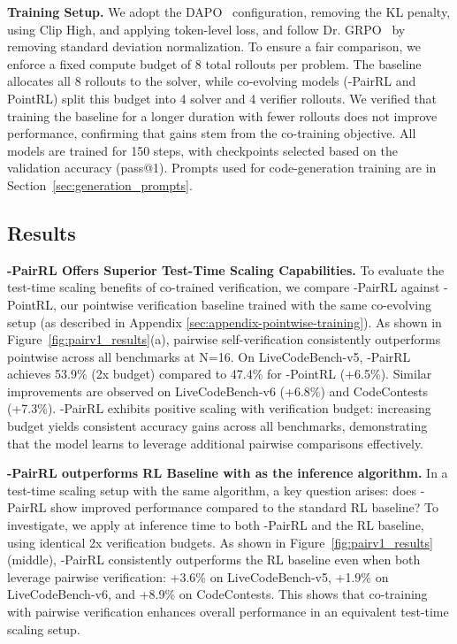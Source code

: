 \textbf{Training Setup.} We adopt the DAPO~\citep{yu2025dapoopensourcellmreinforcement} configuration, removing the KL penalty, using Clip High, and applying token-level loss, and follow Dr. GRPO~\citep{liu2025understandingr1zerotraining} by removing standard deviation normalization. To ensure a fair comparison, we enforce a fixed compute budget of 8 total rollouts per problem. The baseline allocates all 8 rollouts to the solver, while co-evolving models (\method{}-PairRL and PointRL) split this budget into 4 solver and 4 verifier rollouts. We verified that training the baseline for a longer duration with fewer rollouts does not improve performance, confirming that gains stem from the co-training objective. All models are trained for 150 steps, with checkpoints selected based on the validation accuracy (pass@1). Prompts used for code-generation training are in Section~\ref{sec:generation_prompts}.

\subsection{Results}

\textbf{\method{}-PairRL Offers Superior Test-Time Scaling Capabilities.}
To evaluate the test-time scaling benefits of co-trained verification, we compare \method{}-PairRL against \method{}-PointRL, our pointwise verification baseline trained with the same co-evolving setup (as described in Appendix \ref{sec:appendix-pointwise-training}). As shown in Figure~\ref{fig:pairv1_results}(a), pairwise self-verification consistently outperforms pointwise across all benchmarks at N=16. On LiveCodeBench-v5, \method{}-PairRL achieves 53.9\% (2x budget) compared to 47.4\% for \method{}-PointRL (+6.5\%). Similar improvements are observed on LiveCodeBench-v6 (+6.8\%) and CodeContests (+7.3\%). \method{}-PairRL exhibits positive scaling with verification budget: increasing budget yields consistent accuracy gains across all benchmarks, demonstrating that the model learns to leverage additional pairwise comparisons effectively.

\textbf{\method{}-PairRL outperforms RL Baseline with \pairinfer{} as the inference algorithm.}
In a test-time scaling setup with the same algorithm, a key question arises: does \method{}-PairRL show improved performance compared to the standard RL baseline? To investigate, we apply \pairinfer{} at inference time to both \method{}-PairRL and the RL baseline, using identical 2x verification budgets. As shown in Figure~\ref{fig:pairv1_results} (middle), \method{}-PairRL consistently outperforms the RL baseline even when both leverage pairwise verification: +3.6\% on LiveCodeBench-v5, +1.9\% on LiveCodeBench-v6, and +8.9\% on CodeContests. This shows that co-training with pairwise verification enhances overall performance in an equivalent test-time scaling setup.


